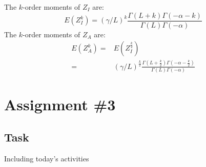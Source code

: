\documentclass{article}
\begin{document}
The $k$-order moments of $Z_I$ are:
\begin{displaymath}
E(Z_I^k) = (\gamma / L)^{k} \frac{\Gamma(L+k)\Gamma(-\alpha-k)}{\Gamma(L)\Gamma(-\alpha)}
\end{displaymath}
The $k$-order moments of $Z_A$ are:
\begin{displaymath}
\begin{split}
E(Z_A^k) =& E(Z_I^{\frac{k}{2}}) \\
=& (\gamma / L)^{\frac{k}{2}} \frac{\Gamma(L+\frac{k}{2})\Gamma(-\alpha-\frac{k}{2})}{\Gamma(L)\Gamma(-\alpha)}
\end{split}
\end{displaymath}

\section*{Assignment \#3}
\subsection*{Task}
Including today's activities
\end{document}
